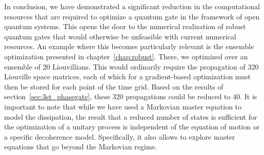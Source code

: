 In conclusion, we have demonstrated a significant reduction in the computational
resources that are required to optimize a quantum gate in the framework of open
quantum systems. This opens the door to the numerical realization of robust
quantum gates that would otherwise be unfeasible with current numerical
resources. An example where this becomes particularly relevant is the ensemble
optimization presented in chapter~\ref{chap:robust}. There, we optimized over an
ensemble of 20 Liouvillians. This would ordinarily require the propagation of 320
Liouville space matrices, each of which for a gradient-based optimization must
then be stored for each point of the time grid. Based on the results of
section~\ref{sec:3st_phasegate}, these 320 propagations could be reduced to 40.
It is important to note that while we have used a Markovian
master equation to model the dissipation, the result that a reduced number of
states is sufficient for the optimization of a unitary process is independent of
the equation of motion or a specific decoherence model. Specifically, it also
allows to explore master equations that go beyond the Markovian regime.
